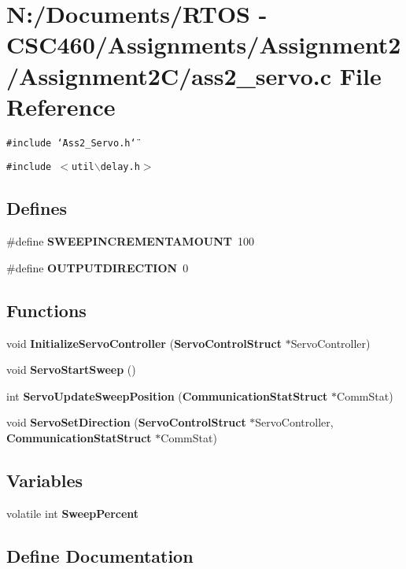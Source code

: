 \section{N:/Documents/RTOS - CSC460/Assignments/Assignment2/Assignment2C/ass2\_\-servo.c File Reference}
\label{ass2__servo_8c}
{\tt \#include \char`\"{}Ass2\_\-Servo.h\char`\"{}}\par
{\tt \#include $<$util$\backslash$delay.h$>$}\par
\subsection*{Defines}
\begin{CompactItemize}
\item 
\#define {\bf SWEEPINCREMENTAMOUNT}~100
\item 
\#define {\bf OUTPUTDIRECTION}~0
\end{CompactItemize}
\subsection*{Functions}
\begin{CompactItemize}
\item 
void {\bf Initialize\-Servo\-Controller} ({\bf Servo\-Control\-Struct} $\ast$Servo\-Controller)
\item 
void {\bf Servo\-Start\-Sweep} ()
\item 
int {\bf Servo\-Update\-Sweep\-Position} ({\bf Communication\-Stat\-Struct} $\ast$Comm\-Stat)
\item 
void {\bf Servo\-Set\-Direction} ({\bf Servo\-Control\-Struct} $\ast$Servo\-Controller, {\bf Communication\-Stat\-Struct} $\ast$Comm\-Stat)
\end{CompactItemize}
\subsection*{Variables}
\begin{CompactItemize}
\item 
volatile int {\bf Sweep\-Percent}
\end{CompactItemize}


\subsection{Define Documentation}
